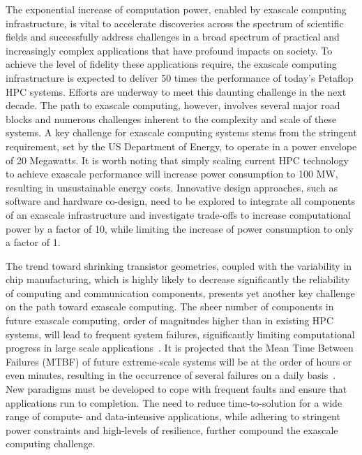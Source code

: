 The exponential increase of computation power, enabled by exascale computing infrastructure, is vital to accelerate discoveries across the spectrum of scientific fields and successfully address challenges in a broad spectrum of practical and increasingly complex applications that have profound impacts on society. To achieve the level of fidelity these applications require, the exascale computing infrastructure is expected to deliver 50 times the performance of today’s Petaflop HPC systems. Efforts are underway to meet this daunting challenge in the next decade. The path to exascale computing, however, involves several major road blocks and numerous challenges inherent to the complexity and scale of these systems. A key challenge for exascale computing systems stems from the stringent requirement, set by the US Department of Energy, to operate in a power envelope of 20 Megawatts. It is worth noting that simply scaling current HPC technology to achieve exascale performance will increase power consumption to 100 MW, resulting in unsustainable energy costs. Innovative design approaches, such as software and hardware co-design,  need to be explored to integrate all components of an exascale infrastructure and investigate trade-offs to increase computational power by a factor of 10, while limiting the increase of power consumption to only a factor of 1. 

The trend toward shrinking transistor geometries, coupled with the variability in chip manufacturing, which is highly likely to decrease significantly the reliability of computing and communication components, presents yet another key challenge on the path toward exascale computing. The sheer number of components in future exascale computing, order of magnitudes higher than in existing HPC systems, will lead to frequent system failures, significantly limiting computational progress in large scale applications~\cite{exa_challenge_2010,snir2014addressing}. It is projected that the Mean Time Between Failures (MTBF) of future extreme-scale systems will be at the order of hours or even minutes, resulting in the occurrence of several failures on a daily basis~\cite{Bergman08exascalecomputing}.  New paradigms must be developed to cope with frequent faults and ensure that applications run to completion. The need to reduce time-to-solution for a wide range of compute- and data-intensive applications, while adhering to stringent power constraints and high-levels of resilience, further compound the exascale computing challenge. 

